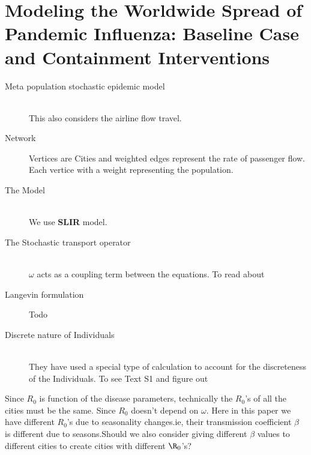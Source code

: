 \documentclass[14pt]{article}
\begin{document}
\section{Modeling the Worldwide Spread of Pandemic
Influenza: Baseline Case and Containment
Interventions}
\begin{description}
  \item[Meta population stochastic epidemic model] \hfill \\ This also
    considers the airline flow travel.
  \item[Network] Vertices are Cities and weighted edges represent the
    rate of passenger flow. Each vertice with a weight representing
    the population.
  \item[The Model] \hfill \\ We use \textbf{SLIR} model.
  \item[The Stochastic transport operator] \hfill \\ $\omega$ acts as
    a coupling term between the equations.{\color{blue} To read about}
  \item[Langevin formulation] {\color{blue} Todo}
  \item[Discrete nature of Individuals] \hfill \\ They have used a
    special type of calculation to account for the discreteness of the
    Individuals.{\color{blue} To see Text S1 and figure out}
\end{description}
 \Large{\color{blue} Since $R_{0}$ is function of the disease
    parameters, technically the $R_{0}$'s of all the cities must be
    the same. Since $R_{0}$ doesn't depend on $\omega$. Here in this
  paper we have different $R_{0}$'s due to seasonality changes.ie,
  their transmission coefficient $\beta$ is different due to
  seasons.Should we also consider giving different $\beta$ values to
  different cities to create cities with different $\R_{0}$'s?}
\end{document}
